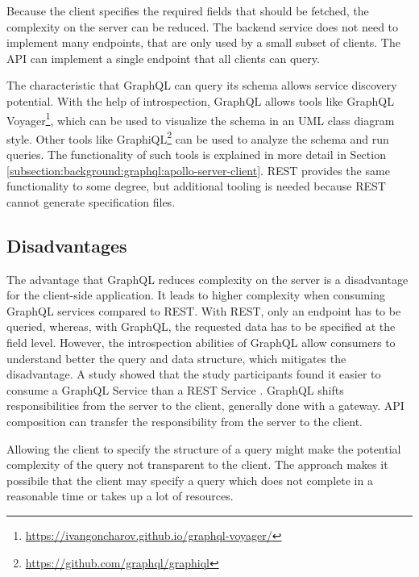 \bigskip

\noindent Because the client specifies the required fields that should be fetched, the complexity on the server can be reduced. The backend service does not need to implement many endpoints, that are only used by a small subset of clients. The \ac{API} can implement a single endpoint that all clients can query. \cite{book:2018:richardson:background:bff:microservices-patterns}

\bigskip

\noindent The characteristic that GraphQL can query its schema allows service discovery potential. With the help of introspection, GraphQL allows tools like GraphQL Voyager\footnote{\url{https://ivangoncharov.github.io/graphql-voyager/}}, which can be used to visualize the schema in an \ac{UML} class diagram style. Other tools like GraphiQL\footnote{\url{https://github.com/graphql/graphiql}} can be used to analyze the schema and run queries. The functionality of such tools is explained in more detail in Section \ref{subsection:background:graphql:apollo-server-client}. \ac{REST} provides the same functionality to some degree, but additional tooling is needed because \ac{REST} cannot generate specification files.

\subsection{Disadvantages}\label{subsection:background:graphql:graphql-disadvantages}

\noindent The advantage that GraphQL reduces complexity on the server is a disadvantage for the client-side application. It leads to higher complexity when consuming GraphQL services compared to \ac{REST}. With \ac{REST}, only an endpoint has to be queried, whereas, with GraphQL, the requested data has to be specified at the field level. However, the introspection abilities of GraphQL allow consumers to understand better the query and data structure, which mitigates the disadvantage. A study \cite{inproceedings:2020:brito:background:graphql:rest-vs-graphql} showed that the study participants found it easier to consume a GraphQL Service than a \ac{REST} Service \cite{inproceedings:2017:de-pauda:background:graphql:handling-anti-patterns}. GraphQL shifts responsibilities from the server to the client, generally done with a gateway. \ac{API} composition can transfer the responsibility from the server to the client.

\bigskip

\noindent Allowing the client to specify the structure of a query might make the potential complexity of the query not transparent to the client. The approach makes it possibile that the client may specify a query which does not complete in a reasonable time or takes up a lot of resources. \cite{book:2018:richardson:background:bff:microservices-patterns}




